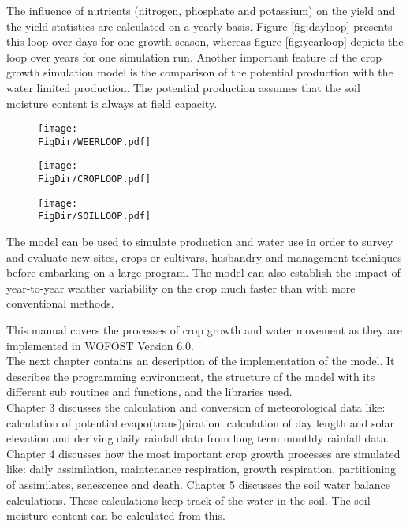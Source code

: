 The influence of nutrients (nitrogen, phosphate and potassium) on the yield and the
yield statistics are calculated on a yearly basis. 
Figure \ref{fig:dayloop} presents this loop over days for one growth season, 
whereas figure \ref{fig:yearloop} depicts the loop over years for one simulation run.
Another important feature of the crop growth simulation model is the comparison of
the potential production with the water limited production. The potential production
assumes that the soil moisture content is always at field capacity.

\begin{figure}[htbp]
\centering
\texttt{[image: \\FigDir/WEERLOOP.pdf]}
\end{figure}

\begin{figure}[htbp]
\centering
\texttt{[image: \\FigDir/CROPLOOP.pdf]}
\end{figure}

\begin{figure}[htbp]
\centering
\texttt{[image: \\FigDir/SOILLOOP.pdf]}
\end{figure}

The model can be used to simulate pro\-duction and water use in order to survey
and evaluate new sites, crops or cultivars, husbandry and management techniques 
before embarking on a large
program. The model can also establish the impact of year-to-year weather variability
on the crop much faster than with more conventional methods. 

This manual covers the processes of crop growth and water movement as they are
implement\-ed in WOFOST Version 6.0. \\
The next chapter contains an description of the implementation of the model. It
describes the programming environment, the structure of the model with its different
sub routines and functions, and the libraries used.\\
Chapter 3 discusses the calculation and conversion of meteorological data like:
calculation of potential evapo(trans)piration, calculation of day length and solar
elevation and deriving daily rainfall data from long term monthly rainfall data.\\
Chapter 4 discusses how the most important crop growth processes are simulated
like: daily assimilation, maintenance respiration, growth respiration, partitioning of
assimilates, senes\-cence and death. Chapter 5 discusses the soil water balance
calculations. These calculations keep track of the water in the soil. The soil moisture
content can be calculated from this. 

